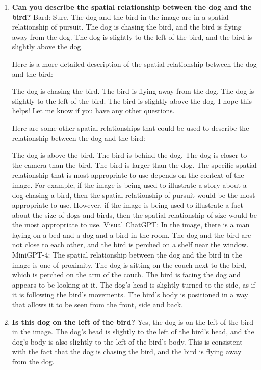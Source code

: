     \begin{enumerate}
        \item \textbf{Can you describe the spatial relationship between the dog and the bird?}
        \subitem Bard: 
        Sure. The dog and the bird in the image are in a spatial relationship of pursuit. The dog is chasing the bird, and the bird is flying away from the dog. The dog is slightly to the left of the bird, and the bird is slightly above the dog.

        Here is a more detailed description of the spatial relationship between the dog and the bird:

        The dog is chasing the bird.
        The bird is flying away from the dog.
        The dog is slightly to the left of the bird.
        The bird is slightly above the dog.
        I hope this helps! Let me know if you have any other questions.

        Here are some other spatial relationships that could be used to describe the relationship between the dog and the bird:

        The dog is above the bird.
        The bird is behind the dog.
        The dog is closer to the camera than the bird.
        The bird is larger than the dog.
        The specific spatial relationship that is most appropriate to use depends on the context of the image. For example, if the image is being used to illustrate a story about a dog chasing a bird, then the spatial relationship of pursuit would be the most appropriate to use. However, if the image is being used to illustrate a fact about the size of dogs and birds, then the spatial relationship of size would be the most appropriate to use.
        \subitem Visual ChatGPT: In the image, there is a man laying on a bed and a dog and a bird in the room. The dog and the bird are not close to each other, and the bird is perched on a shelf near the window.
        \subitem MiniGPT-4: The spatial relationship between the dog and the bird in the image is one of proximity. The dog is sitting on the couch next to the bird, which is perched on the arm of the couch. The bird is facing the dog and appears to be looking at it. The dog’s head is slightly turned to the side, as if it is following the bird’s movements. The bird’s body is positioned in a way that allows it to be seen from the front, side and back.
        \item \textbf{Is this dog on the left of the bird?}
        \subitem Yes, the dog is on the left of the bird in the image. The dog's head is slightly to the left of the bird's head, and the dog's body is also slightly to the left of the bird's body. This is consistent with the fact that the dog is chasing the bird, and the bird is flying away from the dog.


\end{enumerate}
